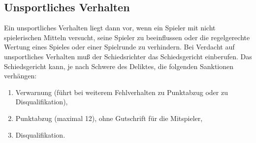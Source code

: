 \documentclass[12pt]{scrartcl}
\begin{document}
\subsection{Unsportliches Verhalten}
Ein unsportliches Verhalten liegt dann vor, wenn ein Spieler mit
nicht spielerischen Mitteln versucht, seine Spieler zu
beeinflussen oder die regelgerechte Wertung eines Spieles oder
einer Spielrunde zu verhindern. Bei Verdacht auf unsportliches
Verhalten muß der Schiedsrichter das Schiedsgericht einberufen.
Das Schiedsgericht kann, je nach Schwere des Deliktes, die
folgenden Sanktionen verhängen:
\begin{enumerate}
  \item Verwarnung (führt bei weiterem Fehlverhalten zu Punktabzug oder zu Disqualifikation),
  \item Punktabzug (maximal 12), ohne Gutschrift für die Mitspieler,
  \item Disqualifikation.
\end{enumerate}
\end{document}
